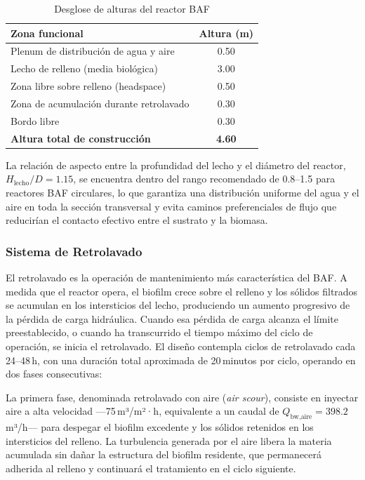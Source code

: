 \documentclass[12pt,a4paper]{article}
\begin{document}
\begin{table}[H]
\centering
\caption{Desglose de alturas del reactor BAF}
\begin{tabular}{lc}
\toprule
\textbf{Zona funcional} & \textbf{Altura (m)} \\
\midrule
Plenum de distribución de agua y aire & 0.50 \\
Lecho de relleno (media biológica) & 3.00 \\
Zona libre sobre relleno (headspace) & 0.50 \\
Zona de acumulación durante retrolavado & 0.30 \\
Bordo libre & 0.30 \\
\midrule
\textbf{Altura total de construcción} & \textbf{4.60} \\
\bottomrule
\end{tabular}
\end{table}

La relación de aspecto entre la profundidad del lecho y el diámetro del reactor, $H_{\text{lecho}} / D = 1.15$, se encuentra dentro del rango recomendado de 0.8--1.5 para reactores BAF circulares, lo que garantiza una distribución uniforme del agua y el aire en toda la sección transversal y evita caminos preferenciales de flujo que reducirían el contacto efectivo entre el sustrato y la biomasa.

\subsubsection*{Sistema de Retrolavado}

El retrolavado es la operación de mantenimiento más característica del BAF. A medida que el reactor opera, el biofilm crece sobre el relleno y los sólidos filtrados se acumulan en los intersticios del lecho, produciendo un aumento progresivo de la pérdida de carga hidráulica. Cuando esa pérdida de carga alcanza el límite preestablecido, o cuando ha transcurrido el tiempo máximo del ciclo de operación, se inicia el retrolavado. El diseño contempla ciclos de retrolavado cada 24--48\,h, con una duración total aproximada de 20\,minutos por ciclo, operando en dos fases consecutivas:

La primera fase, denominada retrolavado con aire (\textit{air scour}), consiste en inyectar aire a alta velocidad —75\,m³/m²·h, equivalente a un caudal de $Q_{\text{bw,aire}} = 398.2$\,m³/h— para despegar el biofilm excedente y los sólidos retenidos en los intersticios del relleno. La turbulencia generada por el aire libera la materia acumulada sin dañar la estructura del biofilm residente, que permanecerá adherida al relleno y continuará el tratamiento en el ciclo siguiente.
\end{document}
